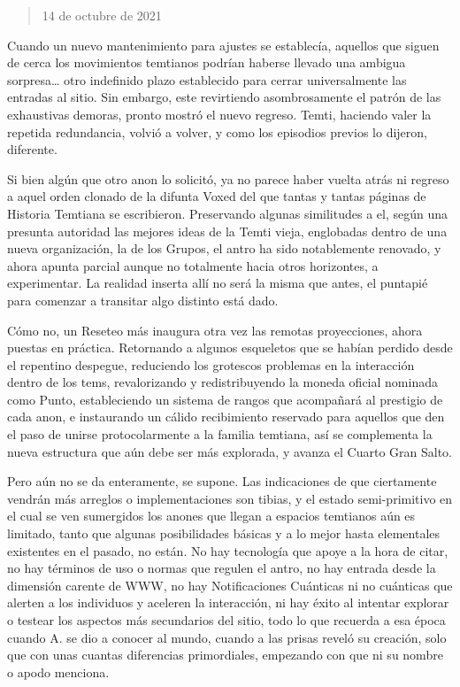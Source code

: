 \documentclass[
  spanish,
]{book}
\begin{document}
\begin{quote}
14 de octubre de 2021
\end{quote}

Cuando un nuevo mantenimiento para ajustes se establecía, aquellos que siguen de cerca los movimientos temtianos podrían haberse llevado una ambigua sorpresa\ldots{} otro indefinido plazo establecido para cerrar universalmente las entradas al sitio. Sin embargo, este revirtiendo asombrosamente el patrón de las exhaustivas demoras, pronto mostró el nuevo regreso. Temti, haciendo valer la repetida redundancia, volvió a volver, y como los episodios previos lo dijeron, diferente.

Si bien algún que otro anon lo solicitó, ya no parece haber vuelta atrás ni regreso a aquel orden clonado de la difunta Voxed del que tantas y tantas páginas de Historia Temtiana se escribieron. Preservando algunas similitudes a el, según una presunta autoridad las mejores ideas de la Temti vieja, englobadas dentro de una nueva organización, la de los Grupos, el antro ha sido notablemente renovado, y ahora apunta parcial aunque no totalmente hacia otros horizontes, a experimentar. La realidad inserta allí no será la misma que antes, el puntapié para comenzar a transitar algo distinto está dado.

Cómo no, un Reseteo más inaugura otra vez las remotas proyecciones, ahora puestas en práctica. Retornando a algunos esqueletos que se habían perdido desde el repentino despegue, reduciendo los grotescos problemas en la interacción dentro de los tems, revalorizando y redistribuyendo la moneda oficial nominada como Punto, estableciendo un sistema de rangos que acompañará al prestigio de cada anon, e instaurando un cálido recibimiento reservado para aquellos que den el paso de unirse protocolarmente a la familia temtiana, así se complementa la nueva estructura que aún debe ser más explorada, y avanza el Cuarto Gran Salto.

Pero aún no se da enteramente, se supone. Las indicaciones de que ciertamente vendrán más arreglos o implementaciones son tibias, y el estado semi-primitivo en el cual se ven sumergidos los anones que llegan a espacios temtianos aún es limitado, tanto que algunas posibilidades básicas y a lo mejor hasta elementales existentes en el pasado, no están. No hay tecnología que apoye a la hora de citar, no hay términos de uso o normas que regulen el antro, no hay entrada desde la dimensión carente de WWW, no hay Notificaciones Cuánticas ni no cuánticas que alerten a los individuos y aceleren la interacción, ni hay éxito al intentar explorar o testear los aspectos más secundarios del sitio, todo lo que recuerda a esa época cuando A. se dio a conocer al mundo, cuando a las prisas reveló su creación, solo que con unas cuantas diferencias primordiales, empezando con que ni su nombre o apodo menciona.
\end{document}
